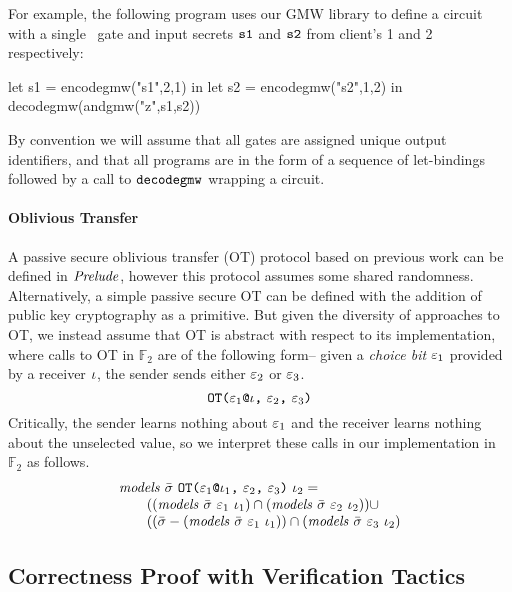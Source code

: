 For example, the following program uses our GMW library to define
a circuit with a single \eand\ gate and input secrets $\texttt{s1}$ and
$\texttt{s2}$ from client's 1 and 2 respectively:
\begin{verbatimtab}
         let s1 = encodegmw("s1",2,1) in
         let s2 = encodegmw("s2",1,2) in
         decodegmw(andgmw("z",s1,s2))
\end{verbatimtab}
By convention we will assume that all gates are assigned unique output
identifiers, and that all programs are in the form
of a sequence of let-bindings followed by a call to $\texttt{decodegmw}$
wrapping a circuit.

\paragraph{Oblivious Transfer} A passive secure oblivious transfer (OT) protocol
based on previous work \cite{barthe2019probabilistic} can be defined in $\mathit{Prelude}$,
however this protocol assumes some shared randomness. Alternatively,
a simple passive secure OT can be defined with the addition of
public key cryptography as a primitive. But given the diversity
of approaches to OT, we instead assume that OT is abstract with
respect to its implementation, where calls to OT in $\mathbb{F}_2$
are of the following form-- given a \emph{choice bit}
$\varepsilon_1$ provided by a receiver $\iota$, the sender
sends either $\varepsilon_2$ or $\varepsilon_3$.
$$
\texttt{OT(} \varepsilon_1\texttt{@}\iota \texttt{,}\ \varepsilon_2 \texttt{,}\ \varepsilon_3 \texttt{)}
$$
Critically, the sender learns nothing about $\varepsilon_1$ and the
receiver learns nothing about the unselected value, so we interpret
these calls in our implementation in $\mathbb{F}_2$ as follows.
$$
\begin{array}{l}
\mathit{models}\ \bar{\sigma}\ \texttt{OT(} \varepsilon_1\texttt{@}\iota_1 \texttt{,}\ \varepsilon_2 \texttt{,}\ \varepsilon_3 \texttt{)}\ \iota_2 = \\
\qquad ((\mathit{models}\ \bar{\sigma}\ \varepsilon_1\ \iota_1) \cap 
(\mathit{models}\ \bar{\sigma}\ \varepsilon_2\ \iota_2)) \cup \\
\qquad ((\bar{\sigma} - (\mathit{models}\ \bar{\sigma}\ \varepsilon_1\ \iota_1)) \cap
(\mathit{models}\ \bar{\sigma}\ \varepsilon_3\ \iota_2)
\end{array}
$$

\subsection{Correctness Proof with Verification Tactics}

